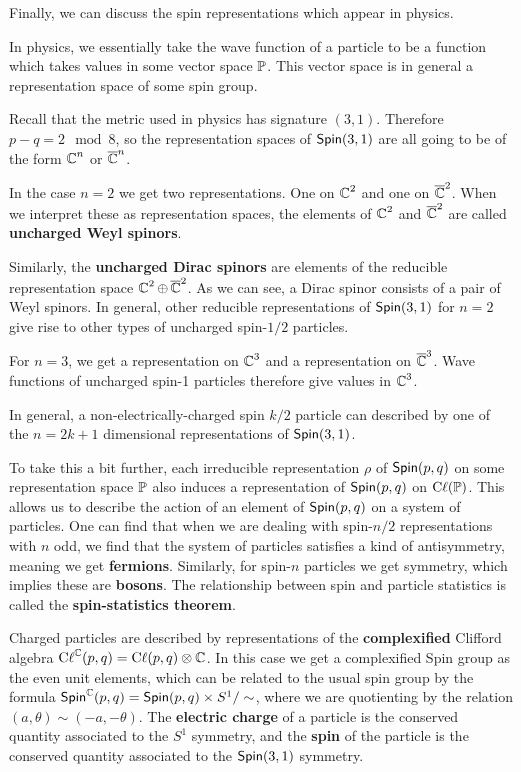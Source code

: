 \begin{physics*}
    Finally, we can discuss the spin representations which appear in physics.

    In physics, we essentially take the wave function of a particle to be a function which takes values in some vector space $\operatorname{\mathbb{P}}$. This vector space is in general a representation space of some spin group. 

    Recall that the metric used in physics has signature $(3,1)$. Therefore $p-q = 2 \mod 8$, so the representation spaces of $\operatorname{\textsf{Spin}}(3,1)$ are all going to be of the form $\operatorname{\mathbb{C}}^n$ or $\overline{\operatorname{\mathbb{C}}}^n$.

    In the case $n=2$ we get two representations. One on $\operatorname{\mathbb{C}}^2$ and one on $\overline{\operatorname{\mathbb{C}}}^2$. When we interpret these as representation spaces, the elements of $\operatorname{\mathbb{C}}^2$ and $\overline{\operatorname{\mathbb{C}}}^2$ are called \textbf{uncharged Weyl spinors}.

    Similarly, the \textbf{uncharged Dirac spinors} are elements of the reducible representation space $\operatorname{\mathbb{C}}^2\oplus\,\overline{\operatorname{\mathbb{C}}}^2$. As we can see, a Dirac spinor consists of a pair of Weyl spinors. In general, other reducible representations of $\operatorname{\textsf{Spin}}(3,1)$ for $n=2$ give rise to other types of uncharged spin-$1/2$ particles.

    For $n=3$, we get a representation on $\operatorname{\mathbb{C}}^3$ and a representation on $\overline{\operatorname{\mathbb{C}}}^3$. Wave functions of uncharged spin-1 particles therefore give values in $\operatorname{\mathbb{C}}^3$. 
    
    In general, a non-electrically-charged spin $k/2$ particle can described by one of the $n=2k+1$ dimensional representations of $\operatorname{\textsf{Spin}}(3,1)$.  
\end{physics*}
\begin{physics*}
    To take this a bit further, each irreducible representation $\rho$ of $\operatorname{\textsf{Spin}}(p,q)$ on some representation space $\operatorname{\mathbb{P}}$ also induces a representation of $\operatorname{\textsf{Spin}}(p,q)$ on $\operatorname{C\ell}(\operatorname{\mathbb{P}})$. This allows us to describe the action of an element of $\operatorname{\textsf{Spin}}(p,q)$ on a system of particles. One can find that when we are dealing with spin-$n/2$ representations with $n$ odd, we find that the system of particles satisfies a kind of antisymmetry, meaning we get \textbf{fermions}. Similarly, for spin-$n$ particles we get symmetry, which implies these are \textbf{bosons}. The relationship between spin and particle statistics is called the \textbf{spin-statistics theorem}.
\end{physics*}
\begin{physics*}
    Charged particles are described by representations of the \textbf{complexified} Clifford algebra $\operatorname{C\ell}^{\operatorname{\mathbb{C}}}(p,q) = \operatorname{C\ell}(p,q)\otimes \operatorname{\mathbb{C}}$. In this case we get a complexified Spin group as the even unit elements, which can be related to the usual spin group by the formula $\operatorname{\textsf{Spin}}^{\operatorname{\mathbb{C}}}(p,q) = \operatorname{\textsf{Spin}}(p,q)\times S^1/\sim$, where we are quotienting by the relation $(a,\theta)\sim(-a,-\theta)$. The \textbf{electric charge} of a particle is the conserved quantity associated to the $S^1$ symmetry, and the \textbf{spin} of the particle is the conserved quantity associated to the $\operatorname{\textsf{Spin}}(3,1)$ symmetry.
\end{physics*}
